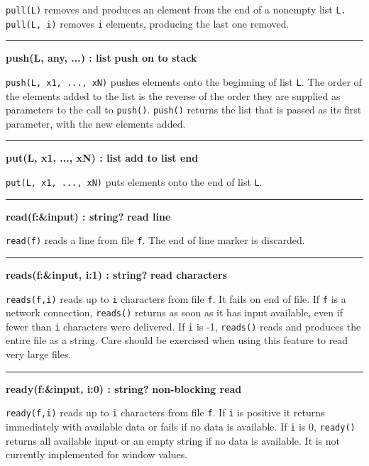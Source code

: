 \noindent
{}\texttt{pull(L)} removes and produces an element from the
end of a nonempty list \texttt{L.} \texttt{pull(L, i)} removes
\texttt{i} elements, producing the last one removed.

\bigskip\hrule\vspace{0.1cm}
\noindent
{\bf push(L, any, ...) : list } \hfill {\bf push on to stack}\WarningNotThreadSafe

\noindent
\texttt{push(L, x1, ..., xN)} pushes elements onto the beginning of list
\texttt{L}. The order of the elements added to the list is the reverse
of the order they are supplied as parameters to the call to
\texttt{push()}. \texttt{push()} returns the list that is
passed as its first parameter, with the new elements added.

\hrule\vspace{0.1cm}
\noindent
{\bf put(L, x1, ..., xN) : list } \hfill {\bf add to list end}\WarningNotThreadSafe

\noindent
{}\texttt{put(L, x1, ..., xN)} puts elements onto the end of
list \texttt{L}.

\bigskip\hrule\vspace{0.1cm}
\noindent
{\bf read(f:\&input) : string? } \hfill {\bf read line}

\noindent
{}\texttt{read(f)} reads a line from file \texttt{f}. The
end of line marker is discarded.

\bigskip\hrule\vspace{0.1cm}
\noindent
{\bf reads(f:\&input, i:1) : string? } \hfill {\bf read characters}

\noindent
{}\texttt{reads(f,i)} reads up to \texttt{i} characters
from file \texttt{f}. It fails on end of file. If \texttt{f} is a
network connection, \texttt{reads()} returns as soon as it has input
available, even if fewer than \texttt{i} characters were delivered. If
\texttt{i} is -1, \texttt{reads()} reads and produces the entire file
as a string. Care should be exercised when using this feature to read
very large files.

\bigskip\hrule\vspace{0.1cm}
\noindent
{\bf ready(f:\&input, i:0) : string? } \hfill {\bf non{}-blocking read}

\noindent
{}\texttt{ready(f,i)} reads up to \texttt{i} characters
from file \texttt{f}. If \texttt{i} is positive it returns immediately with available data or
fails if no data is available. If \texttt{i} is 0, \texttt{ready()}
returns all available input or an empty string if no data is available.
It is not currently implemented for window values.


